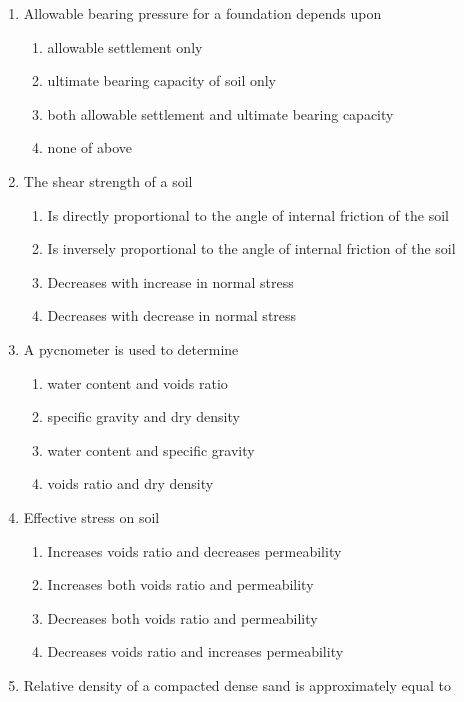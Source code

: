 \documentclass[11pt,a4paper]{article}
\begin{document}
\begin{enumerate}
\begin{enumerate*}[itemjoin=\qquad, label=\Alph*.]
\end{enumerate*}
\item{Allowable bearing pressure for a foundation depends upon}
\begin{enumerate}[label=\Alph*.]
\item{allowable settlement only}
\item{ultimate bearing capacity of soil only}
\item{both allowable settlement and ultimate bearing capacity}
\item{none of above}
\end{enumerate}
\item{The shear strength of a soil}
\begin{enumerate}[label=\Alph*.]
\item{Is directly proportional to the angle of internal friction of the soil}
\item{Is inversely proportional to the angle of internal friction of the soil}
\item{Decreases with increase in normal stress}
\item{Decreases with decrease in normal stress}
\end{enumerate}
\item{A pycnometer is used to determine}
\begin{enumerate}[label=\Alph*.]
\item{water content and voids ratio}
\item{specific gravity and dry density}
\item{water content and specific gravity}
\item{voids ratio and dry density}
\end{enumerate}
\item{Effective stress on soil}
\begin{enumerate}[label=\Alph*.]
\item{Increases voids ratio and decreases permeability}
\item{Increases both voids ratio and permeability}
\item{Decreases both voids ratio and permeability}
\item{Decreases voids ratio and increases permeability}
\end{enumerate}
\item{Relative density of a compacted dense sand is approximately equal to}
\\
\end{enumerate}
\end{document}
